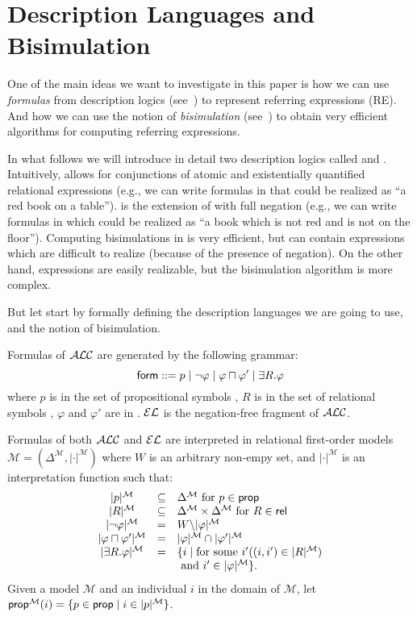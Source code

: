 \newcommand{\gM}{\mathcal{M}}
\newcommand{\gL}{\mathcal{L}}


\section{Description Languages and Bisimulation} \label{sec:bisim}

One of the main ideas we want to investigate in this paper is
how we can use \emph{formulas} from description logics (see~\cite{baad:desc03}) to represent
referring expressions (RE). And how we can use the notion of \emph{bisimulation}
(see~\cite{blac:moda01}) to obtain very efficient algorithms for computing referring expressions.
 
In what follows we will introduce in detail two description logics called \el and \alc.  Intuitively, \el allows
for conjunctions of atomic and existentially quantified relational expressions (e.g.,
we can write formulas in \el that could be realized as ``a red book on a table''). \alc is the extension of \el with full negation
(e.g., we can write formulas in \alc which could be realized as ``a book which is not red and is not on the floor'').  Computing bisimulations in \alc is very efficient, but \alc can contain expressions which are difficult to realize (because of the presence of negation).  On the other hand,
\el expressions are easily realizable, but the bisimulation algorithm is more complex.

But let start by formally defining the description languages we are going to use, and the notion of bisimulation.

\begin{definition}
Formulas of $\mathcal{ALC}$ are generated by the following grammar:
$$
\textsf{form} ::= p \mid \neg \varphi \mid \varphi \sqcap \varphi' \mid \exists R. \varphi
$$
where $p$ is in the set of propositional symbols \prop, $R$ is in the set of relational symbols \rel, $\varphi$ and $\varphi'$ are in \form. $\mathcal{EL}$ is the
negation-free fragment of $\mathcal{ALC}$.

Formulas of both $\mathcal{ALC}$ and $\mathcal{EL}$ are interpreted in relational first-order models
$\gM = (\Delta^\gM,|\cdot|^\gM)$ where $W$ is an arbitrary non-empy set, and $|\cdot|^\gM$ is an interpretation
function such that:
$$
\begin{array}{ccl}
|p|^\gM & \subseteq & \Delta^\gM  \mbox{ for $p \in \prop$}\\
|R|^\gM & \subseteq & \Delta^\gM \times \Delta^\gM  \mbox{ for $R \in \rel$}\\
|\neg \varphi|^\gM & = & W \backslash |\varphi|^\gM\\
|\varphi \sqcap \varphi'|^\gM & = & |\varphi|^\gM \cap |\varphi'|^\gM\\
|\exists R.\varphi|^\gM & = & \{i \mid \mbox{for some } i' ((i,i') \in |R|^\gM)\\
& & \mbox{ and } i' \in |\varphi|^\gM \}.\\
\end{array}
$$
Given a model $\gM$ and an individual $i$ in the domain of $\gM$, let
$\propm(i) = \{p \in \prop \mid i \in |p|^\gM\}$.
\end{definition}

